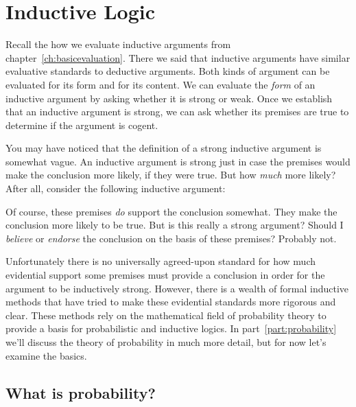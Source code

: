 \chapter{Inductive Logic}
\label{ch:inductivelogic}
\setlength{\parindent}{1em}

Recall the how we evaluate inductive arguments from chapter~\ref{ch:basicevaluation}. There we said that inductive arguments have similar evaluative standards to deductive arguments. Both kinds of argument can be evaluated for its form and for its content. We can evaluate the \emph{form} of an inductive argument by asking whether it is \gls{strong} or \gls{weak}. Once we establish that an inductive argument is strong, we can ask whether its premises are true to determine if the argument is \gls{cogent}.

You may have noticed that the definition of a strong inductive argument is somewhat vague. An inductive argument is strong just in case the premises would make the conclusion more likely, if they were true. But how \emph{much} more likely? After all, consider the following inductive argument:

\begin{kormanize}
\end{kormanize}

Of course, these premises \emph{do} support the conclusion somewhat. They make the conclusion more likely to be true. But is this really a strong argument? Should I \emph{believe} or \emph{endorse} the conclusion on the basis of these premises? Probably not.

Unfortunately there is no universally agreed-upon standard for how much evidential support some premises must provide a conclusion in order for the argument to be inductively strong. However, there is a wealth of formal inductive methods that have tried to make these evidential standards more rigorous and clear. These methods rely on the mathematical field of probability theory to provide a basis for probabilistic and inductive logics. In part~\ref{part:probability} we'll discuss the theory of probability in much more detail, but for now let's examine the basics.

\section{What is probability?}

